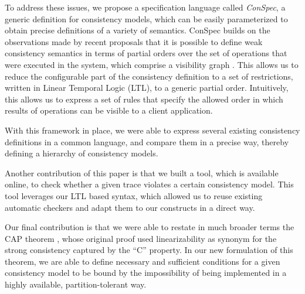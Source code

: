 \documentclass[journal,compsoc]{IEEEtran}
\begin{document}
To address these issues, we propose a specification language called
\emph{ConSpec}, a generic definition for consistency models, which can
be easily parameterized to obtain precise definitions of a variety of
semantics. ConSpec builds on the observations made by recent proposals
that it is possible to define weak consistency semantics in terms of
partial orders over the set of operations that were executed in the
system, which comprise a visibility graph 
\cite{Li:2012:MGS:2387880.2387906, Gotsman:2016:CIS:2837614.2837625, cheng-papoc}. This allows us to reduce
the configurable part of the consistency definition to a set of restrictions,
written in Linear Temporal Logic (LTL), to a generic partial order.
Intuitively, this allows us to express a set of rules that specify the allowed order in which results of operations can be visible to a client application.  


With this framework in place, we were able to express several existing
consistency definitions in a common language, and compare them in a precise
way, thereby defining a hierarchy of consistency models. %
 
Another contribution of this paper is that we built a tool, which is available online, to check whether a given trace violates a certain consistency model. This tool leverages our LTL based syntax, which allowed us to reuse existing automatic checkers and adapt them to our constructs in a direct way.

Our final contribution is that we were able to restate in much broader terms the CAP theorem \cite{brew:cap, Gilbert:2002:BCF:564585.564601}, whose original proof used linearizability as synonym for the strong consistency captured by the ``C'' property. In our new formulation of this theorem, we are able to define necessary and sufficient conditions for a given consistency model to be bound by the impossibility of being implemented in a highly available, partition-tolerant way.
\end{document}
